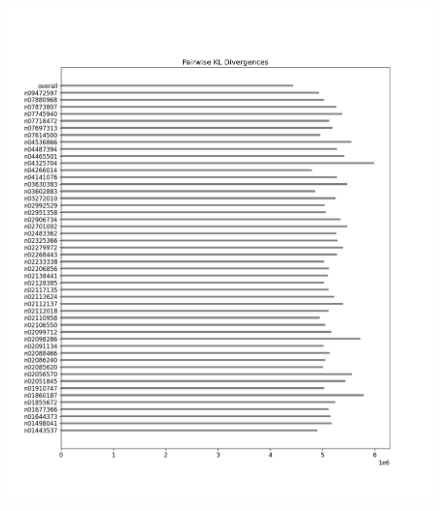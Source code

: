 \documentclass{article}
\begin{document}
    \begin{figure}[H]
        \centering
    
        \begin{minipage}{0.45\textwidth}
            \centering
            \includegraphics[width=\textwidth]{cross_imagenet_imgr_r_untrained/alexnet_kl_div_b_to_apairwise.png} %
            

\end{minipage}
\end{figure}
\end{document}
